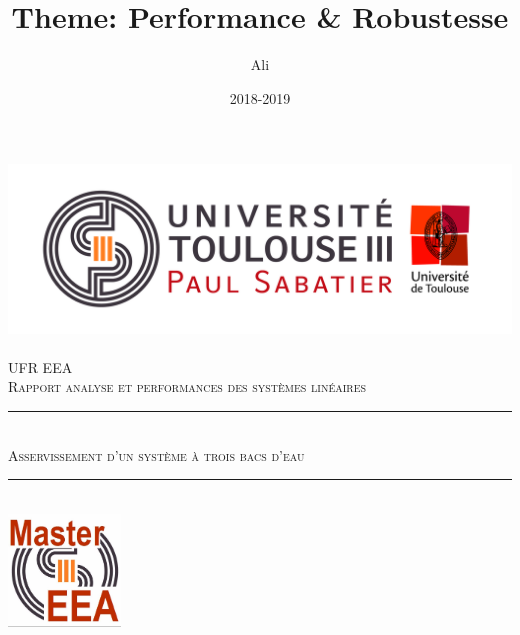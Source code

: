 \documentclass[12pt, a4paper, openany]{report}
\title{Theme: Performance & Robustesse}
\author{Ali \bsc{Kherbiche}}
\date{2018-2019}
\newcommand{\HRule}{\rule{\linewidth}{0.5mm}}
\begin{document}

\makeatletter
  \begin{titlepage}
  

  \begin{sffamily}
   \begin{center}

    \includegraphics[scale=0.5]{Logo_UT3.jpg}~\\[1.5cm]

    \textsc{\LARGE UFR EEA }\\[2cm]
    
    
    \textsc{\Large Rapport analyse et performances des systèmes linéaires}\\[1cm]

    \HRule \\[0.4cm]
    \textsc{ \huge Asservissement d'un système à trois bacs d'eau\\[0.4cm] }

    \HRule \\[2cm]
    \includegraphics[width=3cm,height=3cm,keepaspectratio] {cropped-Logo-master-EEA.jpg}
    \\[2cm]


\end{center}
\end{sffamily}
\end{titlepage}
\end{document}
